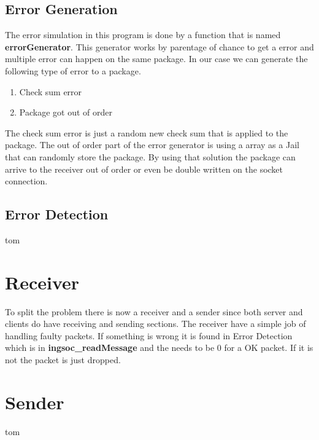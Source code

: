 \subsection{Error Generation}
The error simulation in this program is done by a function that is named \textbf{errorGenerator}. This generator works by parentage of chance to get a error and multiple error can happen on the same package. In our case we can generate the following type of error to a package. 
\begin{enumerate}
    \item Check sum error
    \item Package got out of order
\end{enumerate}
The check sum error is just a random new check sum that is applied to the package. The out of order part of the error generator is using a array as a Jail that can randomly store the package. By using that solution the package can arrive to the receiver out of order or even be double written on the socket connection. 

\subsection{Error Detection}
tom
\section{Receiver}
To split the problem there is now a receiver and a sender since both server and clients do have receiving and sending sections.
The receiver have a simple job of handling faulty packets. If something is wrong it is found in Error Detection which is in \textbf{ingsoc\_readMessage} and the needs to be 0 for a OK packet. If it is not the packet is just dropped. 
\section{Sender}
tom